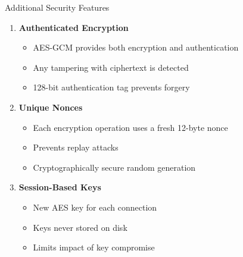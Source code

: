 \documentclass[aspectratio=169]{beamer}
\begin{document}
\begin{frame}{Additional Security Features}
\begin{enumerate}
    \item \textbf{Authenticated Encryption}
    \begin{itemize}
        \item AES-GCM provides both encryption and authentication
        \item Any tampering with ciphertext is detected
        \item 128-bit authentication tag prevents forgery
    \end{itemize}
    
    \vspace{0.3cm}
    
    \item \textbf{Unique Nonces}
    \begin{itemize}
        \item Each encryption operation uses a fresh 12-byte nonce
        \item Prevents replay attacks
        \item Cryptographically secure random generation
    \end{itemize}
    
    \vspace{0.3cm}
    
    \item \textbf{Session-Based Keys}
    \begin{itemize}
        \item New AES key for each connection
        \item Keys never stored on disk
        \item Limits impact of key compromise
    \end{itemize}
\end{enumerate}
\end{frame}
\end{document}
